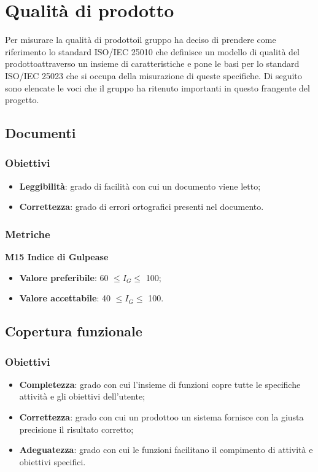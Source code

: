 \section{Qualità di prodotto}
    Per misurare la qualità di prodotto\glosp il gruppo ha deciso di prendere come riferimento lo standard ISO/IEC 25010 che definisce un modello di qualità del prodotto\glosp attraverso un insieme di caratteristiche e pone le basi per lo standard ISO/IEC 25023 che si occupa della misurazione di queste specifiche. Di seguito sono elencate le voci che il gruppo ha ritenuto importanti in questo frangente del progetto\glo.
    \subsection{Documenti}
    	\subsubsection{Obiettivi}
    		\begin{itemize}
    			\item \textbf{Leggibilità}: grado di facilità con cui un documento viene letto;
    			\item \textbf{Correttezza}: grado di errori ortografici presenti nel documento.
    		\end{itemize}
	    \subsubsection{Metriche}
	    \textbf{M15 Indice di Gulpease}
	    \begin{itemize}
	    	\item \textbf{Valore preferibile}: 60 $\le I_{G} \le$ 100;
	    	\item \textbf{Valore accettabile}: 40 $\le I_{G} \le$ 100.
	    \end{itemize}
    \subsection{Copertura funzionale}
        \subsubsection{Obiettivi}
            \begin{itemize}
                \item \textbf{Completezza}: grado con cui l'insieme di funzioni copre tutte le specifiche attività e gli obiettivi dell'utente;
                \item \textbf{Correttezza}: grado con cui un prodotto\glosp o un sistema fornisce con la giusta precisione il risultato corretto;
                \item \textbf{Adeguatezza}: grado con cui le funzioni facilitano il compimento di attività e obiettivi specifici.
            \end{itemize}
